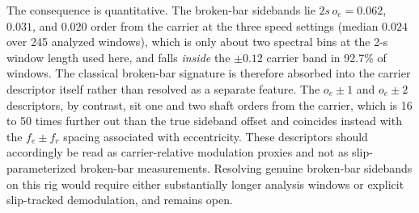 \documentclass[journal]{IEEEtran}
\begin{document}
The consequence is quantitative. The broken-bar sidebands lie $2 s\, o_e =
0.062$, $0.031$, and $0.020$ order from the carrier at the three speed
settings (median $0.024$ over 245 analyzed windows), which is only about two
spectral bins at the 2-s window length used here, and falls \emph{inside} the
$\pm0.12$ carrier band in 92.7\% of windows. The classical broken-bar
signature is therefore absorbed into the carrier descriptor itself rather
than resolved as a separate feature. The $o_e \pm 1$ and $o_e \pm 2$
descriptors, by contrast, sit one and two shaft orders from the carrier,
which is 16 to 50 times further out than the true sideband offset and
coincides instead with the $f_e \pm f_r$ spacing associated with
eccentricity. These descriptors should accordingly be read as
carrier-relative modulation proxies and not as slip-parameterized broken-bar
measurements. Resolving genuine broken-bar
sidebands on this rig would require either substantially longer analysis
windows or explicit slip-tracked demodulation, and remains open.



\end{document}
